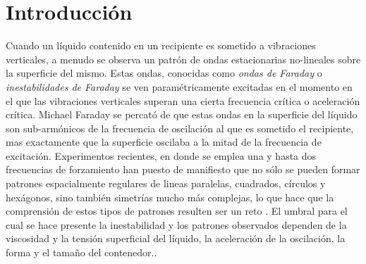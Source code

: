 \chapter*{Introducción}

Cuando un líquido contenido en un recipiente es sometido a vibraciones verticales, a menudo se observa un patrón de ondas estacionarias no-lineales sobre la superficie del mismo. Estas ondas, conocidas como \textit{ondas de Faraday} o \textit{inestabilidades de Faraday} \cite{Faraday1831a, benjamin1954stability} se ven paramétricamente excitadas en el momento en el que las vibraciones verticales superan una cierta frecuencia crítica o aceleración crítica. Michael Faraday \cite{Faraday1831a} se percató de que estas ondas en la superficie del líquido son sub-armónicos de la frecuencia de oscilación al que es sometido el recipiente, mas exactamente que la superficie oscilaba a la mitad de la frecuencia de excitación. Experimentos recientes, en donde se emplea una y hasta dos frecuencias de forzamiento han puesto de manifiesto que no sólo se pueden formar patrones espacialmente regulares de lineas paralelas, cuadrados, círculos y hexágonos, sino también simetrías mucho más complejas, lo que hace que la comprensión de estos tipos de patrones resulten ser un reto \cite{douady1990experimental, edwards1994patterns, binks1997nonlinear, kudrolli1996patterns, arbell2000temporally, arbell2000two, porter2002broken, westra2003patterns}. El umbral para el cual se hace presente la inestabilidad y los patrones observados dependen de la viscosidad y la tensión superficial del líquido, la aceleración de la oscilación, la forma y el tamaño del contenedor..\medskip \bigskip

